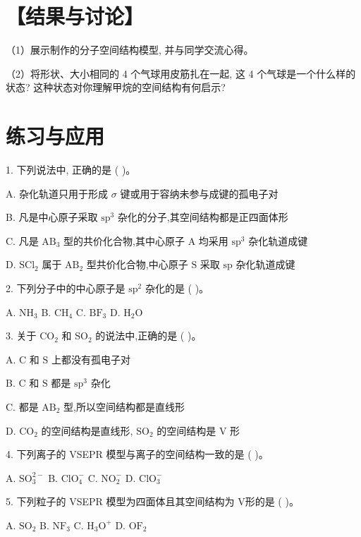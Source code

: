\documentclass[10pt]{article}
\begin{document}
\section*{【结果与讨论】}

（1）展示制作的分子空间结构模型, 并与同学交流心得。

（2）将形状、大小相同的 4 个气球用皮筋扎在一起, 这 4 个气球是一个什么样的状态? 这种状态对你理解甲烷的空间结构有何启示?

\section*{练习与应用}

1. 下列说法中, 正确的是 ( )。

A. 杂化轨道只用于形成 \(\sigma\) 键或用于容纳未参与成键的孤电子对

B. 凡是中心原子采取 \({\mathrm{{sp}}}^{3}\) 杂化的分子,其空间结构都是正四面体形

C. 凡是 \({\mathrm{{AB}}}_{3}\) 型的共价化合物,其中心原子 \(\mathrm{A}\) 均采用 \({\mathrm{{sp}}}^{3}\) 杂化轨道成键

D. \({\mathrm{{SCl}}}_{2}\) 属于 \({\mathrm{{AB}}}_{2}\) 型共价化合物,中心原子 \(\mathrm{S}\) 采取 \(\mathrm{{sp}}\) 杂化轨道成键

2. 下列分子中的中心原子是 \({\mathrm{{sp}}}^{2}\) 杂化的是 ( )。

A. \({\mathrm{{NH}}}_{3}\) B. \({\mathrm{{CH}}}_{4}\) C. \({\mathrm{{BF}}}_{3}\) D. \({\mathrm{H}}_{2}\mathrm{O}\)

3. 关于 \({\mathrm{{CO}}}_{2}\) 和 \({\mathrm{{SO}}}_{2}\) 的说法中,正确的是 ( )。

A. C 和 \(\mathrm{S}\) 上都没有孤电子对

B. \(\mathrm{C}\) 和 \(\mathrm{S}\) 都是 \({\mathrm{{sp}}}^{3}\) 杂化

C. 都是 \({\mathrm{{AB}}}_{2}\) 型,所以空间结构都是直线形

D. \({\mathrm{{CO}}}_{2}\) 的空间结构是直线形, \({\mathrm{{SO}}}_{2}\) 的空间结构是 \(\mathrm{V}\) 形

4. 下列离子的 VSEPR 模型与离子的空间结构一致的是 ( )。

A. \({\mathrm{{SO}}}_{3}^{2 - }\) B. \({\mathrm{{ClO}}}_{4}^{ - }\) C. \({\mathrm{{NO}}}_{2}^{ - }\) D. \({\mathrm{{ClO}}}_{3}^{ - }\)

5. 下列粒子的 VSEPR 模型为四面体且其空间结构为 V形的是 ( )。

A. \({\mathrm{{SO}}}_{2}\) B. \({\mathrm{{NF}}}_{3}\) C. \({\mathrm{H}}_{3}{\mathrm{O}}^{ + }\) D. \({\mathrm{{OF}}}_{2}\)
\end{document}
